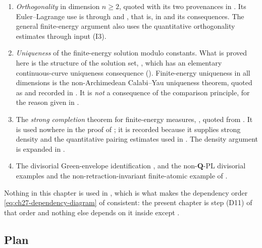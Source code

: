 \begin{enumerate}
\item[\textup{(I1)}]
\emph{Orthogonality} in dimension $n\geq2$, quoted with its two
provenances in .  Its Euler--Lagrange use is through
 and , that
is, in  and its consequences.
The general finite-energy argument also uses the quantitative
orthogonality estimates through input \textup{(I3)}.
\item[\textup{(I2)}]
\emph{Uniqueness} of the finite-energy solution modulo constants.  What is
proved here is the structure of the solution set,
, which has an elementary continuous-curve uniqueness consequence
().  Finite-energy uniqueness in all
dimensions is the non-Archimedean Calabi--Yau uniqueness theorem, quoted as
\cite[Proposition~8.2]{BFJ15} and recorded in
.  It is \emph{not} a consequence
of the comparison principle, for the reason given in
.
\item[\textup{(I3)}]
The \emph{strong completion} theorem for finite-energy measures,
, quoted from
\cite{BJ25FiniteEnergy}.  It is used nowhere in the proof of
; it is recorded because it supplies strong density and the quantitative pairing estimates used
in .  The density argument is
expanded in .
\item[\textup{(I4)}]
The divisorial Green-envelope identification
\cite[Lemma~8.5 and \textup{(8.7)}]{BFJ15}, and the non-$\mathbf Q$-PL divisorial examples and the non-retraction-invariant
finite-atomic example of \cite{BJGreen24}.
\end{enumerate}

Nothing in this chapter is used in
,
which is what makes the dependency order
\eqref{eq:ch27-dependency-diagram} of  consistent:
the present chapter is step \textup{(D11)} of that order and nothing else
depends on it inside  except
.

\subsection{Plan}
\label{sec:ch28-plan}

